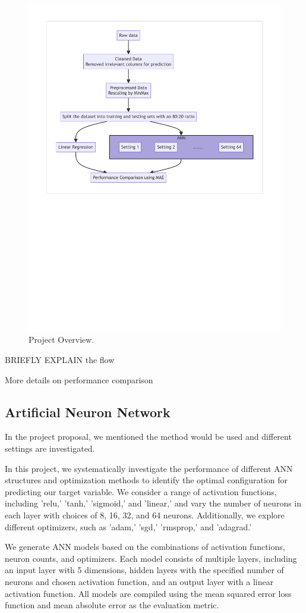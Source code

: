 \documentclass[manuscript,screen,review,nonacm]{acmart}
\begin{document}
\begin{figure}
  \centering
  \includegraphics[width=0.8\linewidth]{flowchart.pdf}
  \caption{Project Overview.}
  \label{fig:flowchart}
\end{figure}

BRIEFLY EXPLAIN the flow

More details on performance comparison

\subsection{Artificial Neuron Network}
In the project proposal, we mentioned the method would be used and different settings are investigated. 

In this project, we systematically investigate the performance of different ANN structures and optimization methods to identify the optimal configuration for predicting our target variable. We consider a range of activation functions, including 'relu,' 'tanh,' 'sigmoid,' and 'linear,' and vary the number of neurons in each layer with choices of 8, 16, 32, and 64 neurons. Additionally, we explore different optimizers, such as 'adam,' 'sgd,' 'rmsprop,' and 'adagrad.'

We generate ANN models based on the combinations of activation functions, neuron counts, and optimizers. Each model consists of multiple layers, including an input layer with 5 dimensions, hidden layers with the specified number of neurons and chosen activation function, and an output layer with a linear activation function. All models are compiled using the mean squared error loss function and mean absolute error as the evaluation metric.
\end{document}
